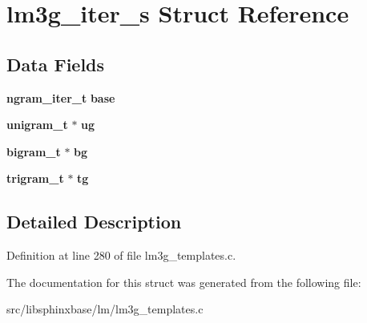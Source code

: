 \section{lm3g\+\_\+iter\+\_\+s Struct Reference}
\label{structlm3g__iter__s}
\subsection*{Data Fields}
\begin{DoxyCompactItemize}
\item 
{\bf ngram\+\_\+iter\+\_\+t} {\bfseries base}\label{structlm3g__iter__s_ae24753ad344180c9b3a6162444ecbc3c}

\item 
{\bf unigram\+\_\+t} $\ast$ {\bfseries ug}\label{structlm3g__iter__s_a8a4ce73a4ae6d75de2682c84ae345b1b}

\item 
{\bf bigram\+\_\+t} $\ast$ {\bfseries bg}\label{structlm3g__iter__s_a484e0af0540b59dced50e8f39a7bf691}

\item 
{\bf trigram\+\_\+t} $\ast$ {\bfseries tg}\label{structlm3g__iter__s_af8d3b111d9a5f98c1e2830866c72658a}

\end{DoxyCompactItemize}


\subsection{Detailed Description}


Definition at line 280 of file lm3g\+\_\+templates.\+c.



The documentation for this struct was generated from the following file\+:\begin{DoxyCompactItemize}
\item 
src/libsphinxbase/lm/lm3g\+\_\+templates.\+c\end{DoxyCompactItemize}
